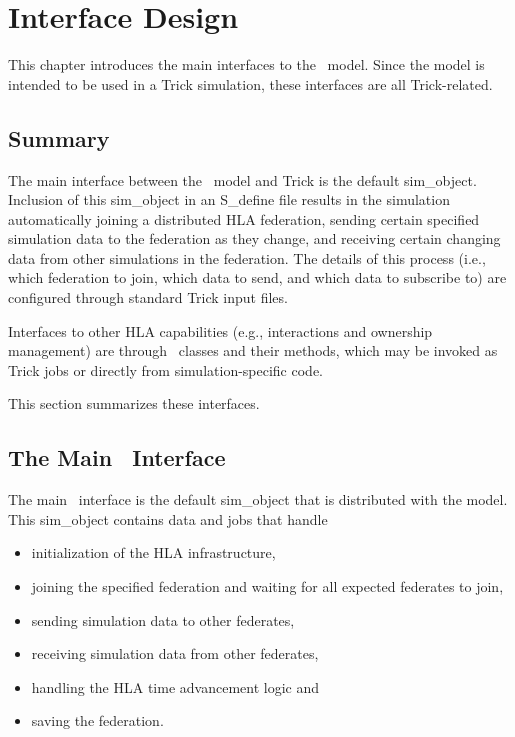%
%
%

\chapter{Interface Design}\label{sec:interface_design}

This chapter introduces the main interfaces to the \TrickHLA\ model.
Since the model is intended to be used in a Trick simulation,
these interfaces are all Trick-related.

\section{Summary}

The main interface between the \TrickHLA\ model and Trick is the
default {\ttfamily sim\_object}.
Inclusion of this {\ttfamily sim\_object} in an {\ttfamily S\_define} file
results in the simulation automatically joining a distributed HLA federation,
sending certain specified simulation data to the federation as they change,
and receiving certain changing data from other simulations in the federation.
The details of this process
(i.e., which federation to join, which data to send, and which data to
subscribe to) are configured through standard Trick input files.

Interfaces to other HLA capabilities
(e.g., interactions and ownership management)
are through \TrickHLA\ classes and their methods, which may be invoked as
Trick jobs or directly from simulation-specific code.

This section summarizes these interfaces.

\section{The Main \TrickHLA\ Interface}

The main \TrickHLA\ interface is the default {\ttfamily sim\_object} that
is distributed with the model.
This {\ttfamily sim\_object} contains data and jobs that handle
\begin{itemize}
  \item{initialization of the HLA infrastructure},
  \item{joining the specified federation and waiting for all expected federates to join},
  \item{sending simulation data to other federates},
  \item{receiving simulation data from other federates},
  \item{handling the HLA time advancement logic} and
  \item{saving the federation}.
\end{itemize}

